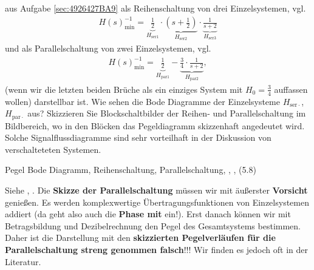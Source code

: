 aus Aufgabe \ref{sec:4926427BA9}
als Reihenschaltung von drei Einzelsystemen, vgl. 
\begin{align}
H(s)_\mathrm{min}^{-1} = \underbrace{\frac{1}{2}}_{H_{\mathrm{ser}1}} \cdot \underbrace{(s+\frac{1}{2})}_{H_{\mathrm{ser}2}} \cdot \underbrace{\frac{1}{s+2}}_{H_{\mathrm{ser}3}}
\end{align}
und als Parallelschaltung von zwei Einzelsystemen, vgl. 
\begin{align}
H(s)_\mathrm{min}^{-1} = \underbrace{\frac{1}{2}}_{H_{\mathrm{par}1}} - \underbrace{\frac{3}{4}\cdot\frac{1}{s+2}}_{H_\mathrm{par2}},
\end{align}
(wenn wir die letzten beiden Brüche als ein einziges System mit $H_0=\frac{3}{4}$ auffassen
wollen) darstellbar ist.
%
Wie sehen die Bode Diagramme der Einzelsysteme $H_{\mathrm{ser}\cdot}$,
$H_{\mathrm{par}\cdot}$ aus?
%
Skizzieren Sie Blockschaltbilder der Reihen- und Parallelschaltung im Bildbereich,
wo in den Blöcken das Pegeldiagramm skizzenhaft angedeutet wird.
Solche Signalflussdiagramme sind sehr vorteilhaft in der Diskussion von
verschalteteten Systemen.

\begin{Werkzeug}
Pegel Bode Diagramm, Reihenschaltung, Parallelschaltung,
, ,  (5.8)
\end{Werkzeug}
\begin{Loesung}
Siehe , .
Die \textbf{Skizze der Parallelschaltung} müssen wir mit äußerster \textbf{Vorsicht} genießen.
Es werden komplexwertige Übertragungsfunktionen von Einzelsystemen addiert
(da geht also auch die \textbf{Phase mit} ein!). Erst danach können wir mit
Betragsbildung und Dezibelrechnung den Pegel des Gesamtsystems bestimmen.
Daher ist die Darstellung mit den \textbf{skizzierten Pegelverläufen für die
Parallelschaltung streng genommen falsch}!!!
Wir finden es jedoch oft in der Literatur.
\end{Loesung}

